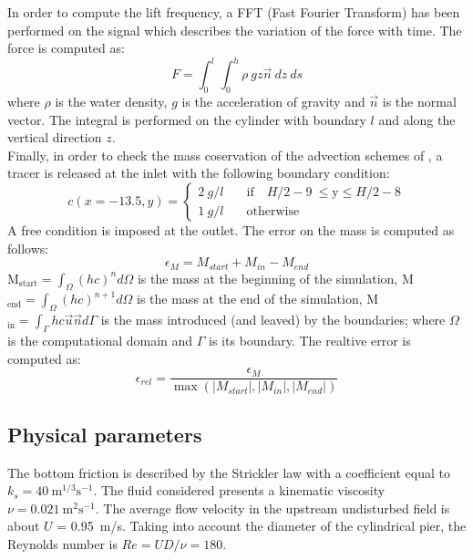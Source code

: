 In order to compute the lift frequency, a FFT (Fast Fourier Transform) has been performed on the signal which describes the variation of the force with time. The force is computed as:
\begin{equation*}
F=\int_0^l\int_0^h \rho~gz \vec{n}~dz~ds
\end{equation*}
where $\rho$ is the water density, $g$ is the acceleration of gravity and $\vec{n}$ is the normal vector. The integral is performed on the cylinder with boundary $l$ and along the vertical direction $z$. \\
Finally, in order to check the mass coservation of the advection schemes of , a tracer is released at the inlet with the following boundary condition:
\begin{equation*}
 c(x=-13.5,y)=\left\{
\begin{array}{rl}
 2 ~g/l\quad & \text{if} \quad H/2-9~\leq \text{y} \leq H/2-8\\
 1 ~g/l\quad & \text{otherwise}
\end{array}\right .
\end{equation*}
A free condition is imposed at the outlet. The error on the mass is computed as follows:
\begin{equation*}
  \epsilon_{M}= M_{start}+M_{in}-M_{end}
\end{equation*}
M$_{\text{start}}=\int_{\Omega}(hc)^nd\Omega$ is the mass at the beginning of the simulation,  M$_{\text{end}}=\int_{\Omega}(hc)^{n+1}d\Omega$ is the mass at the end of the simulation, M$_{\text{in}}=\int_{\Gamma}hc\vec{u}\vec{n}d\Gamma$ is the mass introduced (and leaved) by the boundaries; where $\Omega$ is the computational domain and $\Gamma$ is its boundary.
The realtive error is computed as:
\begin{equation*}
  \epsilon_{rel}=\frac{\epsilon_{M}}{\max(|M_{start}|,|M_{in}|,|M_{end}|)}
\end{equation*}

\subsection{Physical parameters}

The bottom friction is described by the Strickler law with a coefficient equal to $k_s=40~\text{m}^{1/3}\text{s}^{-1}$.
The fluid considered presents a kinematic viscosity $\nu=0.021~\text{m}^2\text{s}^{-1}$. The average flow velocity in the upstream undisturbed field is
about $U$ = 0.95~m/s. Taking into account the diameter of the cylindrical pier, the Reynolds number is $Re = UD/\nu=180$.

